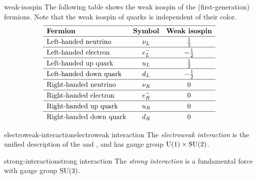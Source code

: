 \begin{example}{weak-isospin}
    The following table shows the weak isospin of the (first-generation) fermions. Note that the weak isospin of quarks is independent of their color.
    \[ \def\arraystretch{1.25} \begin{array}{lcc}
         \hline \textbf{Fermion} & \textbf{Symbol} & \textbf{Weak isospin} \\
         \hline \textup{Left-handed neutrino} & \nu_L & \tfrac{1}{2} \\
         \hline \textup{Left-handed electron} & e^-_L & - \tfrac{1}{2} \\
         \hline \textup{Left-handed up quark} & u_L & \tfrac{1}{2} \\
         \hline \textup{Left-handed down quark} & d_L & - \tfrac{1}{2} \\
         \hline \textup{Right-handed neutrino} & \nu_R & 0 \\
         \hline \textup{Right-handed electron} & e^-_R & 0 \\
         \hline \textup{Right-handed up quark} & u_R & 0 \\
         \hline \textup{Right-handed down quark} & d_R & 0
    \end{array} \]
\end{example}

\begin{topic}{electroweak-interaction}{electroweak interaction}
    The \emph{electroweak interaction} is the unified description of the  and , and has gauge group $\textup{U}(1) \times \textup{SU}(2)$.
\end{topic}

\begin{topic}{strong-interaction}{strong interaction}
    The \emph{strong interaction} is a fundamental force with gauge group $\textup{SU}(3)$.
\end{topic}

